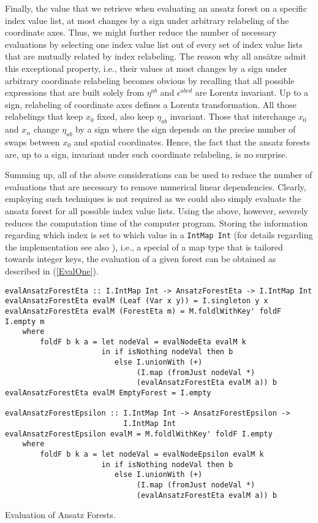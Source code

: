 Finally, the value that we retrieve when evaluating an ansatz forest on a specific index value list, at most changes by a sign under arbitrary relabeling of the coordinate axes. Thus, we might further reduce the number of necessary evaluations by selecting one index value list out of every set of index value lists that are mutually related by index relabeling. The reason why all ansätze admit this exceptional property, i.e., their values at most changes by a sign under arbitrary coordinate relabeling becomes obvious by recalling that all possible expressions that are built solely from $\eta^{ab}$ and $\epsilon^{abcd}$ are Lorentz invariant. Up to a sign, relabeling of coordinate axes defines a Lorentz transformation. All those relabelings that keep $x_0$ fixed, also keep $\eta_{ab}$ invariant. Those that interchange $x_0$ and $x_{\alpha}$ change $\eta_{ab}$ by a sign where the sign depends on the precise number of swaps between $x_0$ and spatial coordinates. Hence, the fact that the ansatz forests are, up to a sign, invariant under such coordinate relabeling, is no surprise. 

Summing up, all of the above considerations can be used to reduce the number of evaluations that are necessary to remove numerical linear dependencies. Clearly, employing such techniques is not required as we could also simply evaluate the ansatz forest for all possible index value lists. Using the above, however, severely reduces the computation time of the computer program. 
Storing the information regarding which index is set to which value in a \texttt{IntMap Int} \cite{HackageIntMap} (for details regarding the implementation see also \cite{Okasaki98fastmergeable}), i.e., a special of a map type that is tailored towards integer keys, the evaluation of a given forest can be obtained as described in (\ref{EvalOne}).
\begin{listing}[hbt!]
\begin{verbatim}
evalAnsatzForestEta :: I.IntMap Int -> AnsatzForestEta -> I.IntMap Int
evalAnsatzForestEta evalM (Leaf (Var x y)) = I.singleton y x
evalAnsatzForestEta evalM (ForestEta m) = M.foldlWithKey' foldF I.empty m
    where
        foldF b k a = let nodeVal = evalNodeEta evalM k
                      in if isNothing nodeVal then b
                         else I.unionWith (+)
                              (I.map (fromJust nodeVal *)
                              (evalAnsatzForestEta evalM a)) b
evalAnsatzForestEta evalM EmptyForest = I.empty

evalAnsatzForestEpsilon :: I.IntMap Int -> AnsatzForestEpsilon ->
                           I.IntMap Int
evalAnsatzForestEpsilon evalM = M.foldlWithKey' foldF I.empty
    where
        foldF b k a = let nodeVal = evalNodeEpsilon evalM k
                      in if isNothing nodeVal then b
                         else I.unionWith (+) 
                              (I.map (fromJust nodeVal *)
                              (evalAnsatzForestEta evalM a)) b  
\end{verbatim} 
\caption{Evaluation of Ansatz Forests.}\label{EvalOne}
\end{listing}


